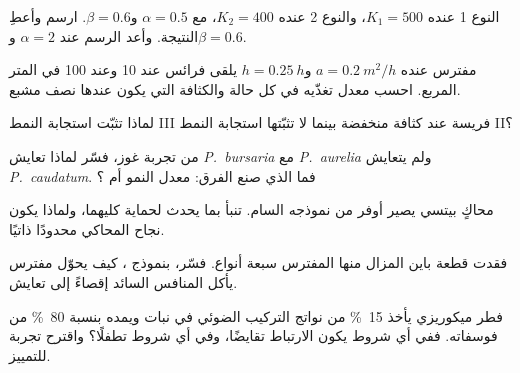 \begin{exercise}[$\star\star$]\label{exo:b1:species-interactions:5}
النوع 1 عنده $K_1 = 500$، والنوع 2 عنده $K_2 = 400$، مع $\alpha =
0.5$ و$\beta = 0.6$. ارسم  وأعطِ النتيجة.
وأعد الرسم عند $\alpha = 2$ و$\beta = 0.6$.
\end{exercise}

\begin{exercise}[$\star\star$]\label{exo:b1:species-interactions:6}
مفترس عنده $a = \qty{0.2}{m^2/h}$ و$h = \qty{0.25}{h}$ يلقى
فرائس عند \qty{10}{} وعند \qty{100}{} في المتر المربع. احسب
معدل تغذّيه في كل حالة والكثافة التي يكون عندها نصف
مشبع.
\end{exercise}

\begin{exercise}[$\star\star$]\label{exo:b1:species-interactions:7}
لماذا تثبّت استجابة النمط III  فريسة عند كثافة
منخفضة بينما لا تثبّتها استجابة النمط II؟
\end{exercise}

\begin{exercise}[$\star\star$]\label{exo:b1:species-interactions:8}
من تجربة غوز، فسّر لماذا تعايش \emph{P.~bursaria}
مع \emph{P.~aurelia} ولم يتعايش \emph{P.~caudatum}. فما الذي صنع
الفرق: معدل النمو أم ؟
\end{exercise}

\begin{exercise}[$\star\star$]\label{exo:b1:species-interactions:9}
محاكٍ بيتسي يصير أوفر من نموذجه السام. تنبأ
بما يحدث لحماية كليهما، ولماذا يكون نجاح المحاكي
محدودًا ذاتيًا.
\end{exercise}

\begin{exercise}[$\star\star\star$]\label{exo:b1:species-interactions:10}
فقدت قطعة باين المزال منها المفترس سبعة أنواع. فسّر، بنموذج ، كيف يحوّل مفترس يأكل المنافس السائد
إقصاءً إلى تعايش.
\end{exercise}

\begin{exercise}[$\star\star\star$]\label{exo:b1:species-interactions:11}
فطر ميكوريزي يأخذ \qty{15}{\%} من نواتج التركيب الضوئي في نبات
ويمده بنسبة \qty{80}{\%} من فوسفاته. ففي أي شروط يكون الارتباط
تقايضًا، وفي أي شروط تطفلًا؟ واقترح تجربة للتمييز.
\end{exercise}

